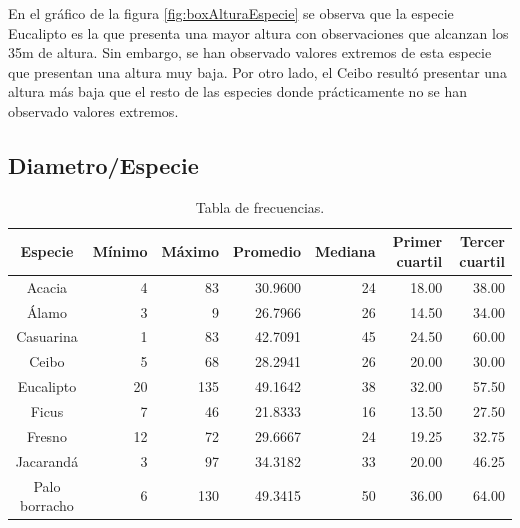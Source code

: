 \documentclass[11pt]{article}
\begin{document}
\begin{justify}
  En el gráfico de la figura \ref{fig:boxAlturaEspecie} se observa
  que la especie Eucalipto es la que presenta una mayor altura con observaciones
  que alcanzan los 35m de altura. Sin embargo, se han observado valores extremos
  de esta especie que presentan una altura muy baja. Por otro lado, el Ceibo
  resultó presentar una altura más baja que el resto de las especies donde
  prácticamente no se han observado valores extremos.
\end{justify}


\newpage
\subsection{Diametro/Especie}

\begin{table}[h!]
  \begin{center}
    \begin{tabular}{| c | r | r | r | r | r | r |}
      \hline
      \textbf{Especie} & \textbf{Mínimo} & \textbf{Máximo} & \textbf{Promedio} &
      \textbf{Mediana} & \textbf{Primer cuartil} & \textbf{Tercer cuartil}  \\ \hline
      Acacia & 4 & 83 & 30.9600 & 24 & 18.00 & 38.00 \\ \hline
      Álamo & 3 & 9 & 	26.7966 & 26 & 14.50 & 34.00 \\ \hline
      Casuarina & 1 & 83 & 42.7091 & 45 & 24.50 & 60.00 \\ \hline
      Ceibo & 5 & 68 & 28.2941 & 26 & 20.00 & 30.00 \\ \hline
      Eucalipto & 20 & 135 & 49.1642 & 38 & 32.00 & 57.50 \\ \hline
      Ficus & 7 & 46 & 21.8333 & 16 & 13.50 & 27.50 \\ \hline
      Fresno & 12 & 72 & 29.6667 & 24 & 19.25 & 32.75 \\ \hline
      Jacarandá & 3 & 97 & 34.3182 & 33 & 20.00 & 46.25 \\ \hline
      Palo borracho & 6 & 130 & 49.3415 & 50 & 36.00 & 64.00 \\ \hline
    \end{tabular}
    \caption{Tabla de frecuencias.}
    \label{tab:tablaDiametroEspecie}
  \end{center}
\end{table}
\end{document}

